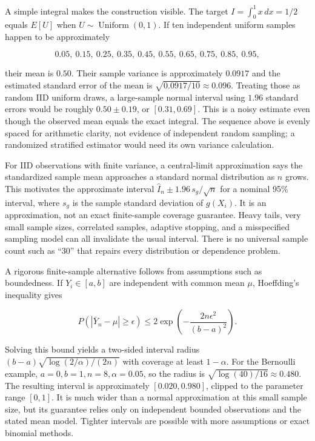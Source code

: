 A simple integral makes the construction visible. The target \(I=\int_0^1 x\,dx=1/2\) equals \(E[U]\) when \(U\sim\operatorname{Uniform}(0,1)\). If ten independent uniform samples happen to be approximately

\[
0.05,\ 0.15,\ 0.25,\ 0.35,\ 0.45,\ 0.55,\ 0.65,\ 0.75,\ 0.85,\ 0.95,
\]

their mean is \(0.50\). Their sample variance is approximately \(0.0917\) and the estimated standard error of the mean is \(\sqrt{0.0917/10}\approx0.096\). Treating those as random IID uniform draws, a large-sample normal interval using \(1.96\) standard errors would be roughly \(0.50\pm0.19\), or \([0.31,0.69]\). This is a noisy estimate even though the observed mean equals the exact integral. The sequence above is evenly spaced for arithmetic clarity, not evidence of independent random sampling; a randomized stratified estimator would need its own variance calculation.

For IID observations with finite variance, a central-limit approximation says the standardized sample mean approaches a standard normal distribution as \(n\) grows. This motivates the approximate interval \(\hat I_n\pm1.96\,s_g/\sqrt n\) for a nominal 95\% interval, where \(s_g\) is the sample standard deviation of \(g(X_i)\). It is an approximation, not an exact finite-sample coverage guarantee. Heavy tails, very small sample sizes, correlated samples, adaptive stopping, and a misspecified sampling model can all invalidate the usual interval. There is no universal sample count such as ``30'' that repairs every distribution or dependence problem.

A rigorous finite-sample alternative follows from assumptions such as boundedness. If \(Y_i\in[a,b]\) are independent with common mean \(\mu\), Hoeffding's inequality gives

\[
P(|\bar Y_n-\mu|\ge\epsilon)\le2\exp\left(-\frac{2n\epsilon^2}{(b-a)^2}\right).
\]

Solving this bound yields a two-sided interval radius \((b-a)\sqrt{\log(2/\alpha)/(2n)}\) with coverage at least \(1-\alpha\). For the Bernoulli example, \(a=0,b=1,n=8,\alpha=0.05\), so the radius is \(\sqrt{\log(40)/16}\approx0.480\). The resulting interval is approximately \([0.020,0.980]\), clipped to the parameter range \([0,1]\). It is much wider than a normal approximation at this small sample size, but its guarantee relies only on independent bounded observations and the stated mean model. Tighter intervals are possible with more assumptions or exact binomial methods.

